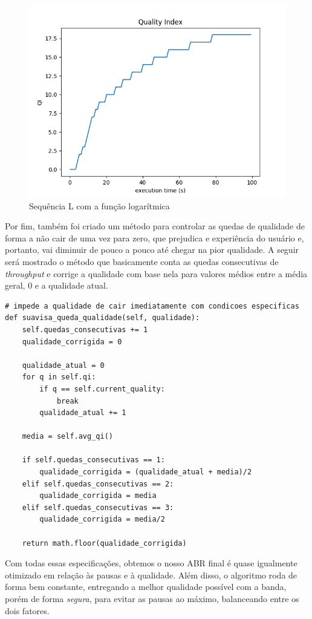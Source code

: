 \documentclass[12pt]{article}
\begin{document}
\begin{figure}[H]
    \centering
    \includegraphics[width=.75\textwidth]{img/qi_L.png}
    \caption{Sequência L com a função logarítmica}
\end{figure}

Por fim, também foi criado um método para controlar as quedas de qualidade de forma a não cair de uma vez para zero, que prejudica e experiência do usuário e, portanto, vai diminuir de pouco a pouco até chegar na pior qualidade. A seguir será mostrado o método que basicamente conta as quedas consecutivas de \textit{throughput} e corrige a qualidade com base nela para valores médios entre a média geral, 0 e a qualidade atual.

\begin{lstlisting}
# impede a qualidade de cair imediatamente com condicoes especificas
def suavisa_queda_qualidade(self, qualidade):
    self.quedas_consecutivas += 1
    qualidade_corrigida = 0

    qualidade_atual = 0
    for q in self.qi:
        if q == self.current_quality:
            break
        qualidade_atual += 1

    media = self.avg_qi()

    if self.quedas_consecutivas == 1:
        qualidade_corrigida = (qualidade_atual + media)/2
    elif self.quedas_consecutivas == 2:
        qualidade_corrigida = media
    elif self.quedas_consecutivas == 3:
        qualidade_corrigida = media/2

    return math.floor(qualidade_corrigida)
\end{lstlisting}

Com todas essas especificações, obtemos o nosso ABR final é quase igualmente otimizado em relação às pausas e à qualidade. Além disso, o algoritmo roda de forma bem constante, entregando a melhor qualidade possível com a banda, porém de forma \textit{segura}, para evitar as pausas ao máximo, balanceando entre os dois fatores.
\end{document}
